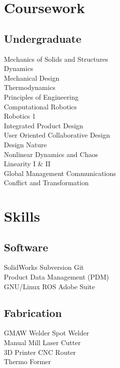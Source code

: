 \documentclass[]{deedy-resume-openfont}
\begin{document}
\begin{minipage}[t]{0.33\textwidth}
\section{Coursework}

\subsection{Undergraduate}

Mechanics of Solids and Structures \\
Dynamics \\
Mechanical Design \\
Thermodynamics \\
Principles of Engineering \\
Computational Robotics\\
Robotics 1 \\
Integrated Product Design\\
User Oriented Collaborative Design \\
Design Nature \\
Nonlinear Dynamics and Chaos\\
Linearity I \& II\\
Global Management Communications\\
Conflict and Transformation\\
\sectionsep


\section{Skills}
\subsection{Software}
SolidWorks \textbullet{} Subversion \textbullet{} Git \\
Product Data Management (PDM) \\
GNU/Linux \textbullet{} ROS \textbullet{} Adobe Suite
\sectionsep

\subsection{Fabrication}
GMAW Welder \textbullet{} Spot Welder \\
Manual Mill \textbullet{} Laser Cutter \\
3D Printer \textbullet{} CNC Router \\
Thermo Former
\sectionsep


\end{minipage}
\end{document}

